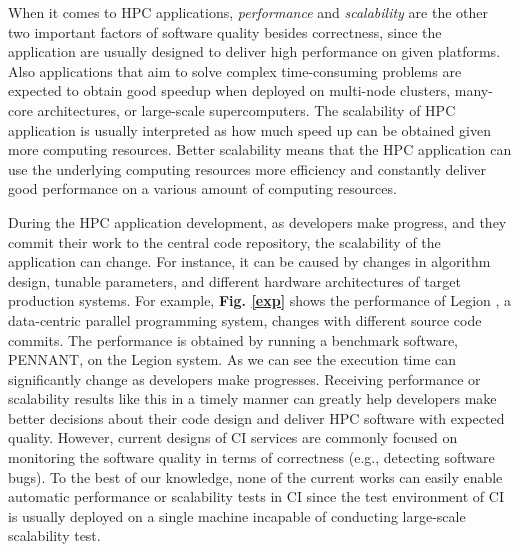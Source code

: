 When it comes to HPC applications, \textit{performance} and \textit{scalability} %
are the other two important factors of software quality besides correctness, since the application are usually designed to deliver high performance on given platforms. Also applications that aim to solve complex time-consuming problems are expected to obtain good speedup when deployed on multi-node clusters, many-core architectures, or large-scale supercomputers. The scalability of HPC application is usually interpreted as how much speed up can be obtained given more computing resources. Better scalability means that the HPC application can use the underlying computing resources more efficiency and constantly deliver good performance on a various amount of computing resources.

During the HPC application development, as developers make progress,
and they commit their work to the central code repository, the scalability of the application can change. For instance, it can be caused by changes in algorithm design, tunable parameters, and different hardware architectures of target production systems. For example, \textbf{Fig. \ref{exp}} shows the  performance of Legion \cite{bauer2012legion}, a data-centric parallel programming system, changes %
with different source code commits. The performance is obtained by running a benchmark software, PENNANT\cite{ferenbaugh2015pennant}, on the Legion system. As we can see the execution time can significantly change as developers make progresses. Receiving performance or scalability results like this in a timely manner can greatly help developers make better decisions about their code design and deliver HPC software with expected quality. However, current designs of CI services are commonly focused on monitoring the software quality in terms of correctness (e.g., detecting software bugs). To the best of our knowledge, none of the current works can easily enable automatic performance or scalability tests in CI since the test environment of CI is usually deployed on a single machine incapable of conducting large-scale scalability test.

